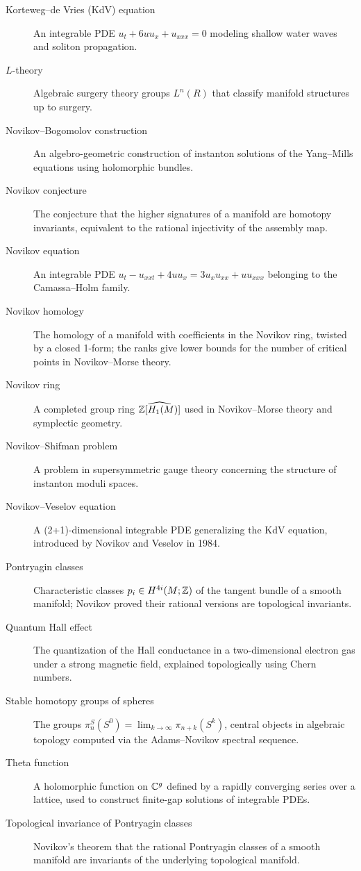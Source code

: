 \begin{description}
    \item[Korteweg--de Vries (KdV) equation] An integrable PDE \(u_t + 6u u_x + u_{xxx} = 0\) modeling shallow water waves and soliton propagation.
    \item[\(L\)-theory] Algebraic surgery theory groups \(L^n(R)\) that classify manifold structures up to surgery.
    \item[Novikov--Bogomolov construction] An algebro-geometric construction of instanton solutions of the Yang--Mills equations using holomorphic bundles.
    \item[Novikov conjecture] The conjecture that the higher signatures of a manifold are homotopy invariants, equivalent to the rational injectivity of the assembly map.
    \item[Novikov equation] An integrable PDE \(u_t - u_{xxt} + 4u u_x = 3 u_x u_{xx} + u u_{xxx}\) belonging to the Camassa--Holm family.
    \item[Novikov homology] The homology of a manifold with coefficients in the Novikov ring, twisted by a closed 1-form; the ranks give lower bounds for the number of critical points in Novikov--Morse theory.
    \item[Novikov ring] A completed group ring \(\widehat{\mathbb{Z}[H_1(M)]}\) used in Novikov--Morse theory and symplectic geometry.
    \item[Novikov--Shifman problem] A problem in supersymmetric gauge theory concerning the structure of instanton moduli spaces.
    \item[Novikov--Veselov equation] A (2+1)-dimensional integrable PDE generalizing the KdV equation, introduced by Novikov and Veselov in 1984.
    \item[Pontryagin classes] Characteristic classes \(p_i \in H^{4i}(M; \mathbb{Z})\) of the tangent bundle of a smooth manifold; Novikov proved their rational versions are topological invariants.
    \item[Quantum Hall effect] The quantization of the Hall conductance in a two-dimensional electron gas under a strong magnetic field, explained topologically using Chern numbers.
    \item[Stable homotopy groups of spheres] The groups \(\pi_n^S(S^0) = \lim_{k \to \infty} \pi_{n+k}(S^k)\), central objects in algebraic topology computed via the Adams--Novikov spectral sequence.
    \item[Theta function] A holomorphic function on \(\mathbb{C}^g\) defined by a rapidly converging series over a lattice, used to construct finite-gap solutions of integrable PDEs.
    \item[Topological invariance of Pontryagin classes] Novikov's theorem that the rational Pontryagin classes of a smooth manifold are invariants of the underlying topological manifold.
\end{description}
